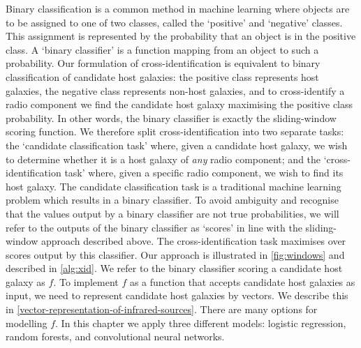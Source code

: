     {Binary classification is a common method in machine learning
    where objects are to be assigned to one of two classes,
    called the `positive' and `negative' classes. This assignment is
    represented by the probability that an object is in the positive class. A
    `binary classifier' is a function mapping from an object to such a
    probability. Our formulation of cross-identification is equivalent to
    binary classification of candidate host galaxies: the positive class
    represents host galaxies, the negative class represents non-host galaxies,
    and to cross-identify a radio component we find the candidate host galaxy
    maximising the positive class probability. In other words,
    the binary classifier is exactly the sliding-window scoring function. We therefore split
    cross-identification into two separate tasks: the `candidate
    classification task' where, given a candidate host galaxy, we wish to
    determine whether it is a host galaxy of \emph{any} radio component; and
    the `cross-identification task' where, given a specific radio
    component, we wish to find its host galaxy. The candidate classification task
    is a traditional machine learning problem which results in a binary
    classifier. To avoid ambiguity and recognise that the values output by a
    binary classifier are not true probabilities, we will refer to the outputs
    of the binary classifier as `scores' in line with the sliding-window approach
    described above. The cross-identification task maximises over scores
    output by this classifier. Our approach is illustrated in
    \autoref{fig:windows} and described in \autoref{alg:xid}. We refer to the
    binary classifier scoring a candidate host galaxy as
    $f$. To implement $f$ as a function that accepts candidate host galaxies
    as input, we need to represent candidate host galaxies by vectors. We
    describe this in \autoref{vector-representation-of-infrared-sources}.
    There are many options for modelling $f$. In this chapter we apply three
    different models: logistic regression, random forests, and convolutional
    neural networks.}

